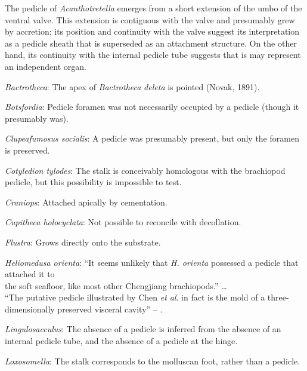 \documentclass[openany]{book}
\begin{document}
The pedicle of \emph{Acanthotretella} emerges from a short extension of
the umbo of the ventral valve. This extension is contiguous with the
valve and presumably grew by accretion; its position and continuity with
the valve suggest its interpretation as a pedicle sheath that is
superseded as an attachment structure. On the other hand, its continuity
with the internal pedicle tube suggests that is may represent an
independent organ.

\hypertarget{Bactrotheca-coding-26}{}
\emph{Bactrotheca}: The apex of \emph{Bactrotheca} \emph{deleta} is
pointed (Novak, 1891).

\hypertarget{Botsfordia-coding-26}{}
\emph{Botsfordia}: Pedicle foramen was not necessarily occupied by a
pedicle (though it presumably was).

\hypertarget{Clupeafumosus_socialis-coding-26}{}
\emph{Clupeafumosus socialis}: A pedicle was presumably present, but
only the foramen is preserved.

\hypertarget{Cotyledion_tylodes-coding-26}{}
\emph{Cotyledion tylodes}: The stalk is conceivably homologous with the
brachiopod pedicle, but this possibility is impossible to test.

\hypertarget{Craniops-coding-26}{}
\emph{Craniops}: Attached apically by cementation.

\hypertarget{Cupitheca_holocyclata-coding-26}{}
\emph{Cupitheca holocyclata}: Not possible to reconcile with
decollation.

\hypertarget{Flustra-coding-26}{}
\emph{Flustra}: Grows directly onto the substrate.

\hypertarget{Heliomedusa_orienta-coding-26}{}
\emph{Heliomedusa orienta}: ``It seems unlikely that \emph{H. orienta}
possessed a pedicle that attached it to\\
the soft seafloor, like most other Chengjiang brachiopods.'' \ldots{}\\
``The putative pedicle illustrated by Chen \emph{et al}.
\citeyearpar[Figs 4, 6, 7]{Chen2007Reinterpretationof} in fact is the
mold of a three-dimensionally preserved visceral cavity'' --
\citet{Zhang2009Architectureand}.

\hypertarget{Lingulosacculus-coding-26}{}
\emph{Lingulosacculus}: The absence of a pedicle is inferred from the
absence of an internal pedicle tube, and the absence of a pedicle at the
hinge.

\hypertarget{Loxosomella-coding-26}{}
\emph{Loxosomella}: The stalk corresponds to the molluscan foot, rather
than a pedicle.
\end{document}
